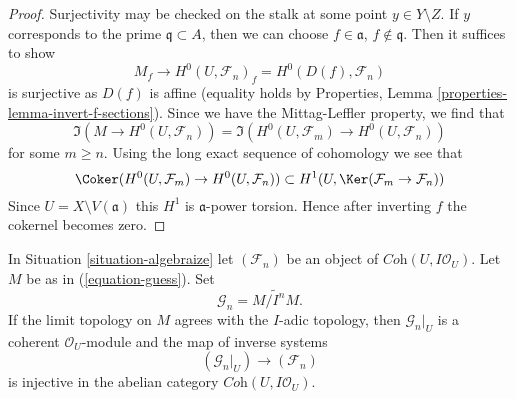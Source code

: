 \begin{proof}
Surjectivity may be checked on the stalk at some point $y \in Y \setminus Z$.
If $y$ corresponds to the prime $\mathfrak q \subset A$, then we can
choose $f \in \mathfrak a$, $f \not \in \mathfrak q$. Then it suffices
to show
$$
M_f \longrightarrow H^0(U, \mathcal{F}_n)_f = H^0(D(f), \mathcal{F}_n)
$$
is surjective as $D(f)$ is affine (equality holds by Properties,
Lemma \ref{properties-lemma-invert-f-sections}). Since we have the
Mittag-Leffler property, we find that
$$
\Im(M \to H^0(U, \mathcal{F}_n)) =
\Im(H^0(U, \mathcal{F}_m) \to H^0(U, \mathcal{F}_n))
$$
for some $m \geq n$. Using the long exact sequence of cohomology we see
that
$$
\Coker(H^0(U, \mathcal{F}_m) \to H^0(U, \mathcal{F}_n))
\subset
H^1(U, \Ker(\mathcal{F}_m \to \mathcal{F}_n))
$$
Since $U = X \setminus V(\mathfrak a)$ this $H^1$ is $\mathfrak a$-power
torsion. Hence after inverting $f$ the cokernel becomes zero.
\end{proof}

\begin{lemma}
\label{lemma-when-topology}
In Situation \ref{situation-algebraize} let $(\mathcal{F}_n)$ be an object
of $\textit{Coh}(U, I\mathcal{O}_U)$. Let $M$ be as in (\ref{equation-guess}).
Set
$$
\mathcal{G}_n = \widetilde{M/I^nM}.
$$
If the limit topology on $M$ agrees with the $I$-adic topology, then
$\mathcal{G}_n|_U$ is a coherent
$\mathcal{O}_U$-module and the map of inverse systems
$$
(\mathcal{G}_n|_U) \longrightarrow (\mathcal{F}_n)
$$
is injective in the abelian category $\textit{Coh}(U, I\mathcal{O}_U)$.
\end{lemma}

